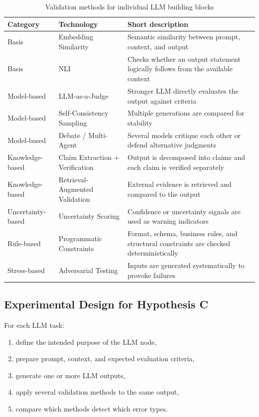 \documentclass[12pt,a4paper]{article}
\begin{document}
\begin{table}[h]
\centering
\begin{tabular}{p{3cm}p{4.2cm}p{6cm}}
\toprule
Category & Technology & Short description \\
\midrule
Basis & Embedding Similarity & Semantic similarity between prompt, context, and output \\
Basis & NLI & Checks whether an output statement logically follows from the available context \\
Model-based & LLM-as-a-Judge & Stronger LLM directly evaluates the output against criteria \\
Model-based & Self-Consistency Sampling & Multiple generations are compared for stability \\
Model-based & Debate / Multi-Agent & Several models critique each other or defend alternative judgments \\
Knowledge-based & Claim Extraction + Verification & Output is decomposed into claims and each claim is verified separately \\
Knowledge-based & Retrieval-Augmented Validation & External evidence is retrieved and compared to the output \\
Uncertainty-based & Uncertainty Scoring & Confidence or uncertainty signals are used as warning indicators \\
Rule-based & Programmatic Constraints & Format, schema, business rules, and structural constraints are checked deterministically \\
Stress-based & Adversarial Testing & Inputs are generated systematically to provoke failures \\
\bottomrule
\end{tabular}
\caption{Validation methods for individual LLM building blocks}
\end{table}

\subsection{Experimental Design for Hypothesis C}

For each LLM task:

\begin{enumerate}
  \item define the intended purpose of the LLM node,
  \item prepare prompt, context, and expected evaluation criteria,
  \item generate one or more LLM outputs,
  \item apply several validation methods to the same output,
  \item compare which methods detect which error types.
\end{enumerate}
\end{document}
